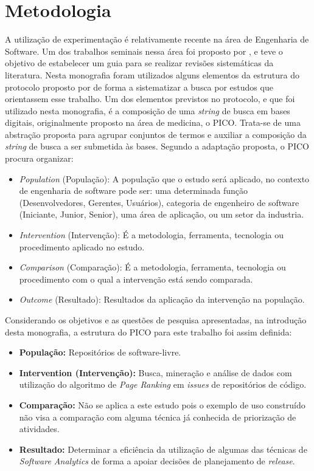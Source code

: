 \chapter{Metodologia}
\label{met}

A utilização de experimentação é relativamente recente na área de Engenharia de Software. Um dos trabalhos seminais nessa área foi proposto por , e teve o objetivo de estabelecer um guia para se realizar revisões sistemáticas da literatura. Nesta monografia foram utilizados alguns elementos da estrutura do protocolo proposto por  de forma a sistematizar a busca por estudos que orientassem esse trabalho. Um dos elementos previstos no protocolo, e que foi utilizado nesta monografia, é a composição de uma \textit{string} de busca em bases digitais, originalmente proposto na área de medicina, o PICO. \cite{citeulike:10757239} Trata-se de uma abstração proposta para agrupar conjuntos de termos e auxiliar a composição da \textit{string} de busca a ser submetida às bases. Segundo a adaptação proposta, o PICO procura organizar:

\begin{itemize}
    \item \textit{Population} (População): A população que o estudo será aplicado, no contexto de engenharia de software pode ser: uma determinada função (Desenvolvedores, Gerentes, Usuários), categoria de engenheiro de software (Iniciante, Junior, Senior), uma área de aplicação, ou um setor da industria.
    \item \textit{Intervention} (Intervenção): É a metodologia, ferramenta, tecnologia ou procedimento aplicado no estudo.
    \item \textit{Comparison} (Comparação): É a metodologia, ferramenta, tecnologia ou procedimento com o qual a intervenção está sendo comparada.
    \item \textit{Outcome} (Resultado): Resultados da aplicação da intervenção na população.
\end{itemize}

Considerando os objetivos e as questões de pesquisa apresentadas, na introdução desta monografia, a estrutura do PICO para este trabalho foi assim definida:

\begin{itemize}
    \item \textbf{População:} Repositórios de software-livre.
    \item \textbf{Intervention (Intervenção):} Busca, mineração e análise de dados com utilização do algoritmo de \textit{Page Ranking} em \textit{issues} de repositórios de código.
    \item \textbf{Comparação:} Não se aplica a este estudo pois o exemplo de uso construído não visa a comparação com alguma técnica já conhecida de priorização de atividades.
    \item \textbf{Resultado:} Determinar a eficiência da utilização de algumas das técnicas de \textit{Software Analytics} de forma a apoiar decisões de planejamento de \textit{release}.
\end{itemize}

